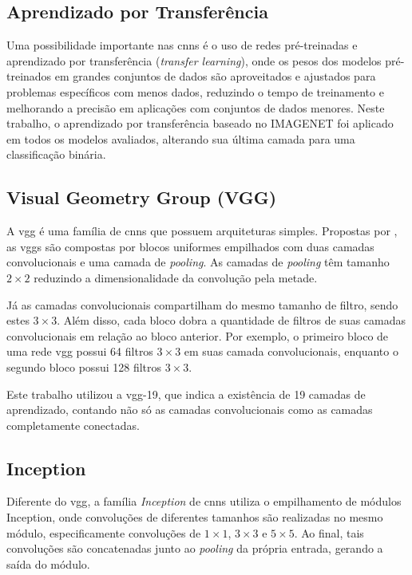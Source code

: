 \subsection{Aprendizado por Transferência}
Uma possibilidade importante nas \acrshort{cnn}s é o uso de redes pré-treinadas e aprendizado por transferência (\textit{transfer learning}), 
onde os pesos dos modelos pré-treinados em grandes conjuntos de dados são aproveitados e ajustados para problemas específicos com menos dados, 
reduzindo o tempo de treinamento e melhorando a precisão em aplicações com conjuntos de dados menores. 
Neste trabalho, o aprendizado por transferência baseado no IMAGENET \cite{deng2009imagenet} foi aplicado em todos os modelos avaliados, alterando sua última camada para uma classificação binária.
\subsection{Visual Geometry Group (VGG)}
A \acrshort{vgg} é uma família de \acrshort{cnn}s que possuem arquiteturas simples. 
Propostas por \cite{vgg}, as \acrshort{vgg}s são compostas por blocos uniformes empilhados com duas camadas convolucionais e uma camada de \textit{pooling}. 
As camadas de \textit{pooling} têm tamanho $2 \times 2$ reduzindo a dimensionalidade da convolução pela metade. 

Já as camadas convolucionais compartilham do mesmo tamanho de filtro, sendo estes $3 \times 3$. Além disso, cada bloco dobra a quantidade de filtros de suas camadas convolucionais em relação ao bloco anterior. Por exemplo, o primeiro bloco de uma rede \acrshort{vgg} possui 64 filtros $3 \times 3$ em suas camada convolucionais, enquanto o segundo bloco possui 128 filtros $3 \times 3$.

Este trabalho utilizou a \acrshort{vgg}-19, que indica a existência de 19 camadas de aprendizado, contando não só as camadas convolucionais como as camadas completamente conectadas.
\subsection{Inception}

Diferente do \acrshort{vgg}, a família \textit{Inception}\cite{inception} de \acrshort{cnn}s utiliza o empilhamento de módulos Inception, onde convoluções de diferentes tamanhos são realizadas no mesmo módulo, especificamente convoluções de $1 \times 1$, $3 \times 3$ e $5 \times 5$. Ao final, tais convoluções são concatenadas junto ao \textit{pooling} da própria entrada, gerando a saída do módulo. 

